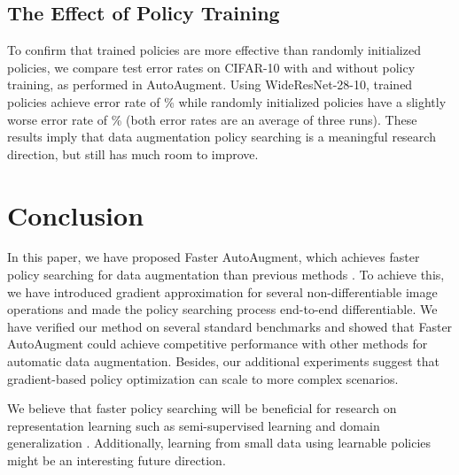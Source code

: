 \documentclass[10pt,twocolumn,letterpaper]{article}
\newcommand{\autoaugment}{AutoAugment\xspace}
\newcommand{\faster}{Faster \autoaugment}
\begin{document}
\subsection{The Effect of Policy Training}

To confirm that trained policies are more effective than randomly initialized policies, we compare test error rates on CIFAR-10 with and without policy training, as performed in \autoaugment \cite{Cubuk2018}. Using WideResNet-28-10, trained policies achieve error rate of \% while randomly initialized policies have a slightly worse error rate of \% (both error rates are an average of three runs). These results imply that data augmentation policy searching is a meaningful research direction, but still has much room to improve.



\section{Conclusion}

In this paper, we have proposed \faster, which achieves faster policy searching for data augmentation than previous methods \cite{Cubuk2018,Ho2019,Lim2019}. To achieve this, we have introduced gradient approximation for several non-differentiable image operations and made the policy searching process end-to-end differentiable. We have verified our method on several standard benchmarks and showed that \faster could achieve competitive performance with other methods for automatic data augmentation. Besides, our additional experiments suggest that gradient-based policy optimization can scale to more complex scenarios.

We believe that faster policy searching will be beneficial for research on representation learning such as semi-supervised learning \cite{Berthelot2019,Xie2019} and domain generalization \cite{Volpi2018}. Additionally, learning from small data using learnable policies might be an interesting future direction.

\clearpage
{\small


}
\end{document}
